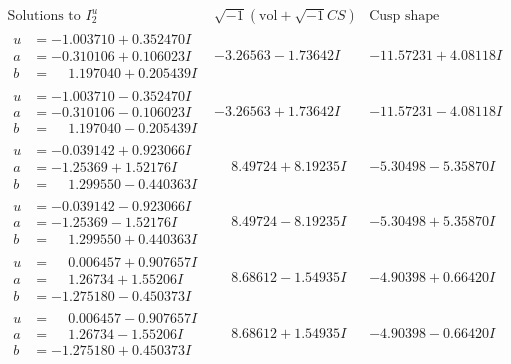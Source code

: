\documentclass[1p]{elsarticle_modified}
\theoremstyle{definition}
\newcommand{\I}{\sqrt{-1}}
\begin{document}
$$\begin{array}{c|c|c}  
\text{Solutions to }I^u_{2}& \I (\text{vol} + \sqrt{-1}CS) & \text{Cusp shape}\\
 \hline 
\begin{aligned}
u &= -1.003710 + 0.352470 I \\
a &= -0.310106 + 0.106023 I \\
b &= \phantom{-}1.197040 + 0.205439 I\end{aligned}
 & -3.26563 - 1.73642 I & -11.57231 + 4.08118 I \\ \hline\begin{aligned}
u &= -1.003710 - 0.352470 I \\
a &= -0.310106 - 0.106023 I \\
b &= \phantom{-}1.197040 - 0.205439 I\end{aligned}
 & -3.26563 + 1.73642 I & -11.57231 - 4.08118 I \\ \hline\begin{aligned}
u &= -0.039142 + 0.923066 I \\
a &= -1.25369 + 1.52176 I \\
b &= \phantom{-}1.299550 - 0.440363 I\end{aligned}
 & \phantom{-}8.49724 + 8.19235 I & -5.30498 - 5.35870 I \\ \hline\begin{aligned}
u &= -0.039142 - 0.923066 I \\
a &= -1.25369 - 1.52176 I \\
b &= \phantom{-}1.299550 + 0.440363 I\end{aligned}
 & \phantom{-}8.49724 - 8.19235 I & -5.30498 + 5.35870 I \\ \hline\begin{aligned}
u &= \phantom{-}0.006457 + 0.907657 I \\
a &= \phantom{-}1.26734 + 1.55206 I \\
b &= -1.275180 - 0.450373 I\end{aligned}
 & \phantom{-}8.68612 - 1.54935 I & -4.90398 + 0.66420 I \\ \hline\begin{aligned}
u &= \phantom{-}0.006457 - 0.907657 I \\
a &= \phantom{-}1.26734 - 1.55206 I \\
b &= -1.275180 + 0.450373 I\end{aligned}
 & \phantom{-}8.68612 + 1.54935 I & -4.90398 - 0.66420 I \\ \hline\begin{aligned}

\end{aligned}
\end{array}$$
\end{document}
